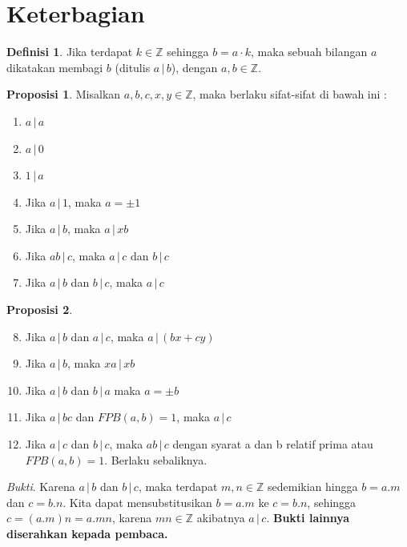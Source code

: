 \documentclass[aspectratio=169]{beamer}
\theoremstyle{definition}
\newtheorem{definisi}{Definisi}
\newtheorem{proposisi}{Proposisi}
\begin{document}
\section{Keterbagian}
\begin{frame}{\insertsection}
  \begin{definisi}
    Jika terdapat $k\in \mathbb{Z}$ sehingga $b=a\cdot k$, maka sebuah bilangan $a$ dikatakan membagi $b$ (ditulis $a\,|\,b$), dengan $a,b \in \mathbb{Z}$.
  \end{definisi}
  \begin{proposisi}
    Misalkan $a,b,c,x, y \in \mathbb{Z}$, maka berlaku sifat-sifat di bawah ini :
    \begin{enumerate}
      \item $a\,|\,a$
      \item $a\,|\,0$
      \item $1\,|\,a$
      \item Jika $a\,|\,1$, maka $a=\pm 1$
      \item Jika $a\,|\,b$, maka $a\,|\,xb$
      \item Jika $ab\,|\,c$, maka $a\,|\,c$ dan $b\,|\,c$
      \item Jika $a\,|\,b$ dan $b\,|\,c$, maka $a\,|\,c$
    \end{enumerate}
  \end{proposisi}
\end{frame}
\begin{frame}{\insertsection}
  \begin{proposisi}
    \begin{enumerate}
      \setcounter{enumi}{7}
      \item Jika $a\,|\,b$ dan $a\,|\,c$, maka $a\,|\,(bx+cy)$
      \item Jika $a\,|\,b$, maka $xa\,|\,xb$
      \item Jika $a\,|\,b$ dan $b\,|\,a$ maka $a=\pm b$
      \item Jika $a\,|\,bc$ dan $FPB(a,b)=1$, maka $a\,|\,c$
      \item Jika $a\,|\,c$ dan $b\,|\,c$, maka $ab\,|\,c$ dengan syarat a dan b relatif prima  atau $FPB(a,b)=1$. Berlaku sebaliknya.
    \end{enumerate}
  \end{proposisi}
  \textit{Bukti}.
  Karena $a\,|\,b$ dan $b\,|\,c$, maka terdapat $m,n\in \mathbb{Z}$ sedemikian hingga $b=a.m$ dan $c=b.n$. Kita dapat mensubstitusikan $b=a.m$ ke $c=b.n$, sehingga $c=(a.m)n=a.mn$, karena $mn\in \mathbb{Z}$ akibatnya $a\,|\,c$.
  \textbf{Bukti lainnya diserahkan kepada pembaca.}
\end{frame}
\end{document}
